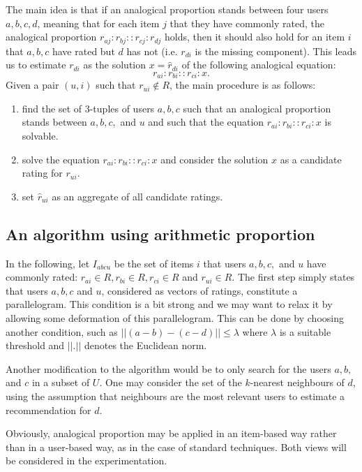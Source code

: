 The main idea is that if an analogical proportion stands between four
users $a, b, c, d$, meaning that for each item $j$ that they have commonly
rated, the analogical proportion $r_{aj} : r_{bj} :: r_{cj} : r_{dj}$ holds,
then it should also hold for an item $i$ that $a, b, c$ have rated but $d$ has
not (i.e. $r_{di}$ is the missing component). This leads us to estimate
$r_{di}$ as the solution $x = \hat{r}_{di}$ of the following analogical equation:
$$r_{ai} : r_{bi} :: r_{ci} : x.$$
\noindent
Given a pair $(u,i)$ such that $r_{ui} \notin R$, the main procedure is as
follows:
\begin{enumerate}
\item find the set of 3-tuples of users $a, b, c$ such that an analogical proportion
stands between $a, b, c,$ and $u$ and such that the equation $r_{ai} : r_{bi} :: r_{ci} : x$
is solvable.
\item solve the equation $r_{ai} : r_{bi} :: r_{ci} : x$ and consider the solution
$x$ as a candidate rating for $r_{ui}$.
\item set $\hat{r}_{ui}$ as an aggregate of all candidate ratings.
\end{enumerate}

\subsection{An algorithm using arithmetic proportion}
In the following, let $I_{abcu}$ be the set of items $i$ that users $a, b, c,$
and $u$ have commonly rated: $r_{ai} \in R, r_{bi} \in R, r_{ci} \in R$ and
$r_{ui}\in R$.
The first step simply states that users $a, b, c$ and $u$, considered as
vectors of ratings, constitute a parallelogram.  This condition is a bit strong
and we may want to relax it by allowing some deformation of this parallelogram.
This can be done by choosing another condition, such as $||(a-b) - (c-d)|| \leq
\lambda$ where $\lambda$ is a suitable threshold and $||.||$ denotes the
Euclidean norm.

Another modification to the algorithm would be to only search for the users
$a, b,$ and $c$ in a subset of $U$. One may consider the set of the $k$-nearest
neighbours of $d$, using the assumption that neighbours are the most relevant
users to estimate a recommendation for $d$.

Obviously, analogical proportion may be applied in an item-based way rather
than in a user-based way, as in the case of standard techniques. Both views
will be considered in the experimentation.

